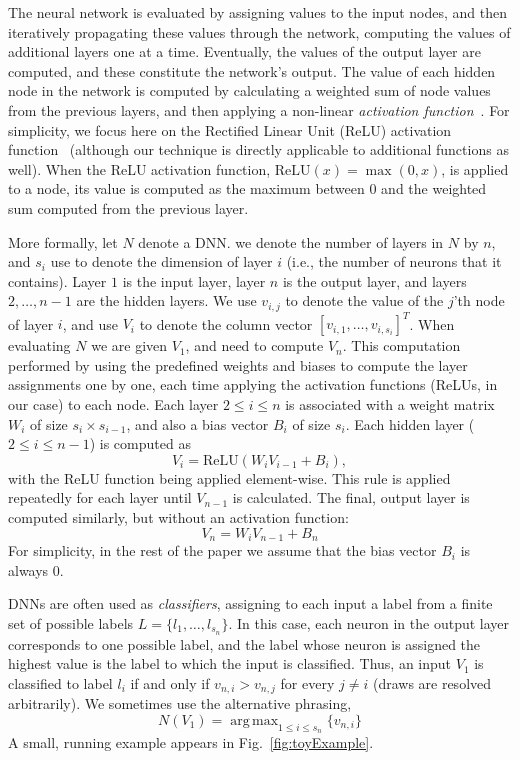 \documentclass{easychair}
\DeclareMathOperator*{\argmax}{arg\,max}
\newcommand{\relu}{\text{ReLU}\xspace{}}
\newcommand{\guy}[1]{\marginpar{\textcolor{orange}{Guy: #1}}}
\begin{document}
The neural network is evaluated by assigning values to the input
nodes, and then iteratively propagating these values through the
network, computing the values of additional layers one at a
time. Eventually, the values of the output layer are computed, and
these constitute the network's output.  The value of each hidden node
in the network is computed by calculating a weighted sum of node
values from the previous layers, and then applying a non-linear
\emph{activation function}~\cite{FoBeCu16}.  For simplicity, we focus
here on the Rectified Linear Unit (ReLU) activation
function~\cite{NaHi10} (although our technique is directly applicable
to additional functions as well).  When the ReLU activation function,
$\relu{}(x) = \max{}(0, x)$, is applied to a node, its value is
computed as the maximum between $0$ and the weighted sum computed from
the previous layer.

More formally, let $N$ denote a DNN. we
denote the number of layers in $N$ by $n$, and $s_i$ use to denote the
dimension of layer $i$ (i.e., the number of neurons that it contains).
Layer $1$ is the input layer, layer $n$ is the output layer, and
layers $2,\ldots,n-1$ are the hidden layers.
We use $v_{i,j}$  to denote the value of the $j$'th node of layer $i$,
and use $V_i$ to denote the column vector $[v_{i,1},\ldots,v_{i,s_i}]^T$.
When evaluating $N$ we are given $V_1$, and need to compute $V_n$.
This computation 
performed by using the predefined weights and biases to compute the
layer assignments one by one, each time applying the activation
functions (ReLUs, in our case) to each node. Each layer $2\leq i\leq
n$
is associated
with a 
weight matrix $W_i$ of size $s_{i}\times s_{i-1}$, and also a bias vector $B_i$ of size
$s_i$.
Each hidden layer ($2\leq i \leq n-1$) 
is computed as
\[
V_i = \relu{}(W_i  V_{i-1} + B_i),
\]
with the ReLU
function being applied element-wise.
This rule is applied repeatedly for each layer until $V_{n-1}$ is
calculated.
The final, output layer is
computed similarly, but without an activation function:
\[
  V_n = W_i  V_{n-1} + B_n
\]
For simplicity, in the rest of the paper we assume that
the bias vector $B_i$ is always $0$.

DNNs are often used as \emph{classifiers}, assigning to each input a
label from a finite set of possible labels $L=\{l_1,\ldots,l_{s_n}\}$. In this case, each neuron
in the output layer corresponds to one possible label, and the label
whose neuron is assigned the highest value is the label to which the
input is classified. Thus, an input $V_1$ is classified to label $l_i$
if and only if $v_{n,i}>v_{n,j}$ for every $j\neq i$ (draws are
resolved arbitrarily). We sometimes use the alternative phrasing,
\[
  N(V_1) = \argmax_{1\leq i\leq s_n}\{v_{n,i}\}
\]
A small, running example appears in Fig.~\ref{fig:toyExample}.
\guy{TODO: Ben, please add a toy example, also to serve as our running
  example throughout the paper}
\end{document}
